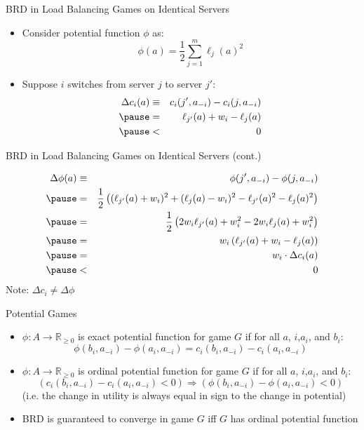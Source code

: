 \documentclass[11pt,aspectratio=169]{beamer}
\begin{document}
  
  \begin{frame}{BRD in Load Balancing Games on Identical Servers}
   \begin{itemize}
    \item Consider \alert{potential function} $\phi$ as:
    $$\phi(a) = \frac{1}{2}\sum_{j=1}^m\ell_j(a)^2$$
    \item Suppose $i$ switches from server $j$ to server $j'$:
    \begin{eqnarray*}
     \Delta c_i(a) & \equiv & c_i(j', a_{-i}) - c_i(j, a_{-i}) \\ \pause
     & = & \ell_{j'}(a) + w_i - \ell_j(a) \\ \pause 
     & < & 0
    \end{eqnarray*}
   \end{itemize}
  \end{frame}


  \begin{frame}{BRD in Load Balancing Games on Identical Servers (cont.)}
   \begin{center}
    \begin{eqnarray*}
     \Delta \phi(a) & \equiv & \phi(j', a_{-i}) - \phi(j, a_{-i}) \\ \pause
     & = & \frac{1}{2}\left((\ell_{j'}(a)+w_i)^2 + (\ell_j(a)-w_i)^2 - \ell_{j'}(a)^2 - \ell_j(a)^2  \right) \\ \pause
     & = & \frac{1}{2}\left(2w_i\ell_{j'}(a) + w_i^2 -2w_i\ell_j(a) + w_i^2  \right) \\ \pause
     & = & w_i\left(\ell_{j'}(a) + w_i - \ell_j(a)  \right) \\ \pause
     & = & w_i\cdot \Delta c_i(a) \\ \pause 
     & < & 0
    \end{eqnarray*}
    \pause
    \hspace{-8cm}
    \alert{Note: $\Delta c_i \neq \Delta \phi$}
   \end{center}
  \end{frame}
  
  
  \begin{frame}{Potential Games}
   \begin{itemize}[<+->]
   \setlength{\itemsep}{1.2em}
    \item $\phi:A\rightarrow \mathbb{R}_{\geq 0}$ is \alert{exact potential function} for game $G$ if for all $a$, $i$,$a_i$, and $b_i$:
    $$\phi(b_i, a_{-i}) - \phi(a_i, a_{-i}) = c_i(b_i, a_{-i}) - c_i(a_i,a_{-i})$$
    \item $\phi:A\rightarrow \mathbb{R}_{\geq 0}$ is \alert{ordinal potential function} for game $G$ if for all $a$, $i$,$a_i$, and $b_i$:
    $$(c_i(b_i, a_{-i}) - c_i(a_i,a_{-i}) < 0) \Rightarrow (\phi(b_i, a_{-i}) - \phi(a_i, a_{-i}) < 0)$$
    (i.e. the change in utility is always equal \alert{in sign} to the change in potential)
    \item BRD is \alert{guaranteed} to converge in game $G$ \alert{iff} $G$ has ordinal potential function
   \end{itemize}
  \end{frame}
  
\end{document}
